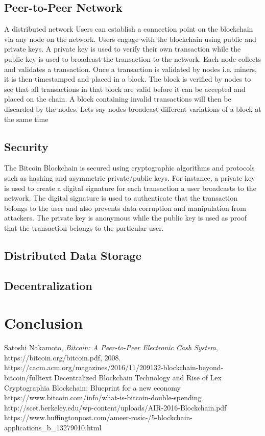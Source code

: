 \documentclass[report]{IEEEtran}
\begin{document}
\subsection{Peer-to-Peer Network}
A distributed network  Users can establish a connection point on the blockchain via any node on the network. Users engage with the blockchain using public and private keys. A private key is used to verify their own transaction while the public key is used to broadcast the transaction to the network. Each node collects and validates a transaction. Once a transaction is validated by nodes i.e. miners, it is then timestamped and placed in a block. The block is verified by nodes to see that all transactions in that block are valid before it can be accepted and placed on the chain. A block containing invalid transactions will then be discarded by the nodes. Lets say nodes broadcast different variations of a block at the same time
\subsection{Security}
The Bitcoin Blockchain is secured using cryptographic algorithms and protocols such as hashing and asymmetric private/public keys. For instance, a private key is used to create a digital signature for each transaction a user broadcasts to the network. The digital signature is used to authenticate that the transaction belongs to the user and also prevents data corruption and manipulation from attackers. The private key is anonymous while the public key is used as proof that the transaction belongs to the particular user. 
\subsection{Distributed Data Storage}
\subsection{Decentralization}
\section{Conclusion}

\begin{thebibliography}{1}

Satoshi Nakamoto, \emph{Bitcoin: A Peer-to-Peer Electronic Cash System}, https://bitcoin.org/bitcoin.pdf, 2008.
https://cacm.acm.org/magazines/2016/11/209132-blockchain-beyond-bitcoin/fulltext
Decentralized Blockchain Technology and Rise of Lex Cryptographia
Blockchain: Blueprint for a new economy
https://www.bitcoin.com/info/what-is-bitcoin-double-spending
http://scet.berkeley.edu/wp-content/uploads/AIR-2016-Blockchain.pdf
https://www.huffingtonpost.com/ameer-rosic-/5-blockchain-applications_b_13279010.html

\end{thebibliography}
\end{document}
